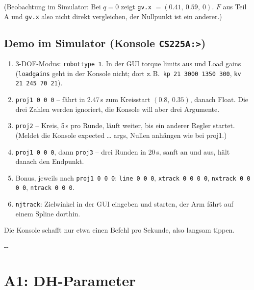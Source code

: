 \documentclass[10pt,a4paper]{article}
\makeatletter
\newcommand{\secneed}[1]{\par\penalty\@M\begingroup\setlength{\dimen@}{#1}\dimen@ii\pagegoal
  \advance\dimen@ii-\pagetotal\ifdim\dimen@>\dimen@ii\ifdim\dimen@ii>\z@\vfil\fi\penalty-\@M\fi\endgroup}
\let\oldsection\section
\renewcommand{\section}{\secneed{9\baselineskip}\oldsection}
\newcommand{\code}[1]{\texttt{#1}}
\makeatother
\begin{document}
\vspace{2pt}
(Beobachtung im Simulator: Bei $q = 0$ zeigt \code{gv.x} $= (0.41,\ 0.59,\ 0)$. $F$ aus Teil A und \code{gv.x} also nicht
direkt vergleichen, der Nullpunkt ist ein anderer.)

\subsection{Demo im Simulator (Konsole \code{CS225A:>})}
\begin{enumerate}
  \item 3-DOF-Modus: \code{robottype 1}. In der GUI \glqq torque limits\grqq{} aus und \glqq Load gains\grqq{}
        (\code{loadgains} geht in der Konsole nicht; dort z.\,B.\ \code{kp 21 3000 1350 300}, \code{kv 21 245 70 21}).
  \item \code{proj1 0 0 0} -- fährt in 2.47\,s zum Kreisstart $(0.8,\ 0.35)$, danach Float. Die drei Zahlen werden ignoriert,
        die Konsole will aber drei Argumente.
  \item \code{proj2} -- Kreis, 5\,s pro Runde, läuft weiter, bis ein anderer Regler startet. (Meldet die Konsole
        \glqq expected \ldots{} args\grqq, Nullen anhängen wie bei proj1.)
  \item \code{proj1 0 0 0}, dann \code{proj3} -- drei Runden in 20\,s, sanft an und aus, hält danach den Endpunkt.
  \item Bonus, jeweils nach \code{proj1 0 0 0}: \code{line 0 0 0}, \code{xtrack 0 0 0 0}, \code{nxtrack 0 0 0 0},
        \code{ntrack 0 0 0}.
  \item \code{njtrack}: Zielwinkel in der GUI eingeben und starten, der Arm fährt auf einem Spline dorthin.
\end{enumerate}
Die Konsole schafft nur etwa einen Befehl pro Sekunde, also langsam tippen.

\section{A1: DH-Parameter}
\end{document}
